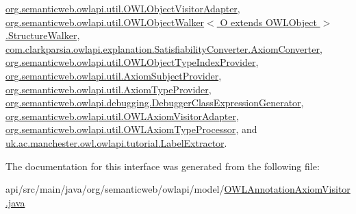 \hyperlink{classorg_1_1semanticweb_1_1owlapi_1_1util_1_1_o_w_l_object_visitor_adapter_a2fa7120a44bddd14670d47f090a2aafa}{org.\-semanticweb.\-owlapi.\-util.\-O\-W\-L\-Object\-Visitor\-Adapter}, \hyperlink{classorg_1_1semanticweb_1_1owlapi_1_1util_1_1_o_w_l_object_walker_3_01_o_01extends_01_o_w_l_object_01_4_1_1_structure_walker_a2e9fc4ec8ea3f961a54f81c67c0fcab8}{org.\-semanticweb.\-owlapi.\-util.\-O\-W\-L\-Object\-Walker$<$ O extends O\-W\-L\-Object $>$.\-Structure\-Walker}, \hyperlink{classcom_1_1clarkparsia_1_1owlapi_1_1explanation_1_1_satisfiability_converter_1_1_axiom_converter_a1116ae6a00982915b3f3a058053f0f85}{com.\-clarkparsia.\-owlapi.\-explanation.\-Satisfiability\-Converter.\-Axiom\-Converter}, \hyperlink{classorg_1_1semanticweb_1_1owlapi_1_1util_1_1_o_w_l_object_type_index_provider_a5c688c3d3a08935239c8542531600016}{org.\-semanticweb.\-owlapi.\-util.\-O\-W\-L\-Object\-Type\-Index\-Provider}, \hyperlink{classorg_1_1semanticweb_1_1owlapi_1_1util_1_1_axiom_subject_provider_a48267d6ca771ea4bea949323d338cece}{org.\-semanticweb.\-owlapi.\-util.\-Axiom\-Subject\-Provider}, \hyperlink{classorg_1_1semanticweb_1_1owlapi_1_1util_1_1_axiom_type_provider_a80d2df32985ead373c998760614114de}{org.\-semanticweb.\-owlapi.\-util.\-Axiom\-Type\-Provider}, \hyperlink{classorg_1_1semanticweb_1_1owlapi_1_1debugging_1_1_debugger_class_expression_generator_a59cc5d82eaf942886d08dda304d5bb3a}{org.\-semanticweb.\-owlapi.\-debugging.\-Debugger\-Class\-Expression\-Generator}, \hyperlink{classorg_1_1semanticweb_1_1owlapi_1_1util_1_1_o_w_l_axiom_visitor_adapter_afb5e296761dc092d0a2d5fccd262caa0}{org.\-semanticweb.\-owlapi.\-util.\-O\-W\-L\-Axiom\-Visitor\-Adapter}, \hyperlink{classorg_1_1semanticweb_1_1owlapi_1_1util_1_1_o_w_l_axiom_type_processor_a2382c795c331b2af60ec72480d6cfa0f}{org.\-semanticweb.\-owlapi.\-util.\-O\-W\-L\-Axiom\-Type\-Processor}, and \hyperlink{classuk_1_1ac_1_1manchester_1_1owl_1_1owlapi_1_1tutorial_1_1_label_extractor_adeb66983a07dc1cfc9ee165396a77dba}{uk.\-ac.\-manchester.\-owl.\-owlapi.\-tutorial.\-Label\-Extractor}.



The documentation for this interface was generated from the following file\-:\begin{DoxyCompactItemize}
\item 
api/src/main/java/org/semanticweb/owlapi/model/\hyperlink{_o_w_l_annotation_axiom_visitor_8java}{O\-W\-L\-Annotation\-Axiom\-Visitor.\-java}\end{DoxyCompactItemize}
